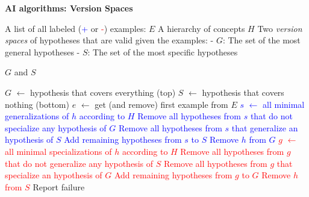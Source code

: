 \documentclass[11pt] {article}
\newcommand{\algorithmicinput}{\textbf{Input:}}
\newcommand{\algorithmicoutput}{\textbf{Output:}}
\newcommand{\INPUT}{\item[\algorithmicinput]}
\newcommand{\OUTPUT}{\item[\algorithmicoutput]}
\newcommand{\algorithmicalgo}{\textbf{Algorithm:}}
\newcommand{\ALGO}{\item[\algorithmicalgo]}
\begin{document}
\pagestyle{empty}


\begin{center}
\LARGE
\textbf{AI algorithms: Version Spaces}\\
\end{center}
\vspace{1cm}

\begin{algorithmic}
\INPUT
\STATE A list of all labeled (\textcolor{blue}{+} or \textcolor{red}{-}) examples: $E$
\STATE A hierarchy of concepts $H$
\STATE Two \emph{version spaces} of hypotheses that are valid given the examples:
\STATE \hspace{0.3cm} - $G$: The set of the most general hypotheses 
\STATE \hspace{0.3cm} - $S$: The set of the most specific hypotheses

\OUTPUT 
\STATE $G$ and $S$
\end{algorithmic}
\begin{algorithmic}
\ALGO
\STATE $G$ $\leftarrow$ {hypothesis that covers everything (top)}
\STATE $S$ $\leftarrow$ {hypothesis that covers nothing (bottom)}
\STATE $e$ $\leftarrow$ get (and remove) first example from $E$
\textcolor{blue}{
\STATE $s$ $\leftarrow$ all minimal generalizations of $h$ according to $H$
\STATE Remove all hypotheses from $s$ that do not specialize any hypothesis of $G$
\STATE Remove all hypotheses from $s$ that generalize an hypothesis of $S$
\STATE Add remaining hypotheses from $s$ to $S$
\ENDFOR
{}
\STATE Remove $h$ from $G$
\ENDFOR
\ENDIF}
\textcolor{red}{
\STATE $g$ $\leftarrow$ all minimal specializations of $h$ according to $H$
\STATE Remove all hypotheses from $g$ that do not generalize any hypothesis of $S$
\STATE Remove all hypotheses from $g$ that specialize an hypothesis of $G$
\STATE Add remaining hypotheses from $g$ to $G$
\ENDFOR
{}
\STATE Remove $h$ from $S$
\ENDFOR
\ENDIF}
\STATE Report failure
\ENDIF
\ENDWHILE
\end{algorithmic}


\end{document}
